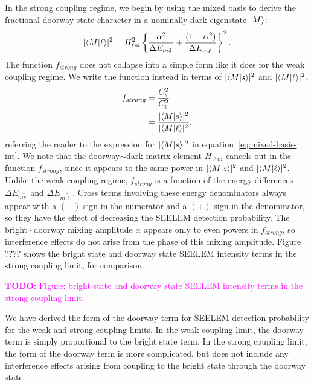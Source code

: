 \documentclass[12pt]{mitthesis}
\newcommand{\TODO} [1]{\textcolor{magenta}{\textbf{TODO:} #1}}
\newcommand{\ts}{\tilde{s}\,}
\newcommand{\tl}{\tilde{\ell}\,}
\begin{document}
In the strong coupling regime, we begin by using the mixed basis to
derive the fractional doorway state character in a nominally dark
eigenstate $\mathinner{|{M}\rangle}$:
\begin{equation}
  \lvert \braket{M|\ell} \rvert^2 = 
  H_{\ell m}^2 \left \lbrace
    \frac{\alpha^2}{\Delta E_{m \ts}} +
    \frac{(1-\alpha^2)}{\Delta E_{m \tl}}
  \right \rbrace^2.
\end{equation}
The function $f_{strong}$ does not collapse into a simple form like it
does for the weak coupling regime.  We write the function instead in
terms of $\lvert \mathinner{\langle{M|s}\rangle} \rvert^2$ and $\lvert \mathinner{\langle{M|\ell}\rangle}
\rvert^2$,
\begin{equation}
  \begin{split}
    f_{strong} &= \frac{C_s^2}{C_{\ell}^2}\\
    &= \frac{\lvert \mathinner{\langle{M|s}\rangle} \rvert^2}
    {\lvert \mathinner{\langle{M|\ell}\rangle} \rvert^2},\\
  \end{split}
\end{equation}
referring the reader to the expression for $\lvert \mathinner{\langle{M|s}\rangle}
\rvert^2$ in equation~\ref{eq:mixed-basis-int}.  We note that the
doorway$\sim$dark matrix element $H_{\ell m}$ cancels out in the
function $f_{strong}$, since it appears to the same power in $\lvert
\mathinner{\langle{M|s}\rangle} \rvert^2$ and $\lvert \mathinner{\langle{M|\ell}\rangle} \rvert^2$.  Unlike
the weak coupling regime, $f_{strong}$ is a function of the energy
differences $\Delta E_{m \ts}$ and $\Delta E_{m \tl}$.  Cross terms
involving these energy denominators always appear with a $(-)$ sign in
the numerator and a $(+)$ sign in the denominator, so they have the
effect of decreasing the SEELEM detection probability.  The
bright$\sim$doorway mixing amplitude $\alpha$ appears only to even
powers in $f_{strong}$, so interference effects do not arise from the
phase of this mixing amplitude.  Figure ???? shows the bright state
and doorway state SEELEM intensity terms in the strong coupling limit,
for comparison.

\TODO{Figure: bright state and doorway state SEELEM intensity terms in
  the strong coupling limit.}

We have derived the form of the doorway term for SEELEM detection
probability for the weak and strong coupling limits.  In the weak
coupling limit, the doorway term is simply proportional to the bright
state term.  In the strong coupling limit, the form of the doorway
term is more complicated, but does not include any interference effects
arising from coupling to the bright state through the doorway state.
\end{document}
